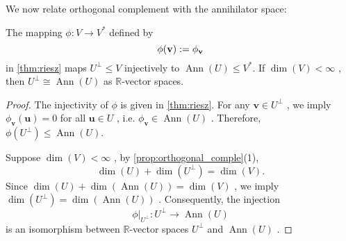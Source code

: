 We now relate orthogonal complement with the annihilator space:
\begin{proposition} The mapping \(\phi  : V \rightarrow  {V}^*\) defined by
$$\phi({\bf v}) := \phi_{\bf v}$$
in \autoref{thm:riesz} maps \({U}^{\perp} \leq  V\) injectively to \(\operatorname{Ann}\left( U\right)  \leq  {V}^*\). If \(\dim \left( V\right)  < \infty\) , then \({U}^{\perp} \cong  \operatorname{Ann}\left( U\right)\) as \(\mathbb{R}\)-vector spaces.
\end{proposition}

\begin{proof} The injectivity of \(\phi\) is given in \autoref{thm:riesz}. For any \(\mathbf{v} \in  {U}^{\perp}\) , we imply \({\phi }_{\mathbf{v}}\left( \mathbf{u}\right)  = 0\) for all \(\mathbf{u} \in  U\) , i.e. \({\phi }_{\mathbf{v}} \in  \operatorname{Ann}\left( U\right)\) . Therefore, \(\phi \left( {U}^{\perp}\right)  \leq  \operatorname{Ann}\left( U\right)\).

\medskip
Suppose \(\dim \left( V\right)  < \infty\) , by \autoref{prop:orthogonal_comple}(1),
\[
\dim \left( U\right)  + \dim \left( {U}^{\perp}\right)  = \dim \left( V\right).
\]
Since \(\dim \left( U\right)  + \dim \left( {\operatorname{Ann}\left( U\right) }\right)  = \dim \left( V\right)\) , we imply \(\dim \left( {U}^{\perp}\right)  = \dim \left( {\operatorname{Ann}\left( U\right) }\right)\) .
Consequently, the injection
\[
\phi|_{U^{\perp}}  : {U}^{\perp} \rightarrow  \operatorname{Ann}\left( U\right)
\]
is an isomorphism between \(\mathbb{R}\)-vector spaces \({U}^{\perp}\) and \(\operatorname{Ann}\left( U\right)\) .
\end{proof}